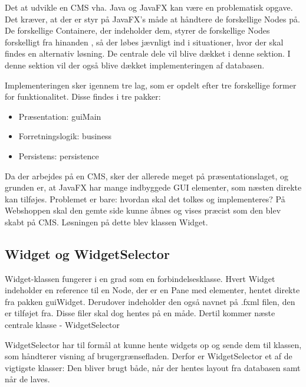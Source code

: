 
Det at udvikle en CMS vha. Java og JavaFX kan være en problematisk opgave. Det kræver, at der er styr på JavaFX's måde at håndtere de forskellige Nodes på. De forskellige Containere, der indeholder dem, styrer de forskellige Nodes forskelligt fra hinanden , så der løbes jævnligt ind i situationer, hvor der skal findes en alternativ løsning. De centrale dele vil blive dækket i denne sektion. I denne sektion vil der også blive dækket implementeringen af databasen.

Implementeringen sker igennem tre lag, som er opdelt efter tre forskellige former for funktionalitet. Disse findes i tre pakker:

\begin{itemize}
    \item Præsentation: guiMain
    \item Forretningslogik: business
    \item Persistens: persistence
\end{itemize}

Da der arbejdes på en CMS, sker der allerede meget på præsentationslaget, og grunden er, at JavaFX har mange indbyggede GUI elementer, som næsten direkte kan tilføjes. Problemet er bare: hvordan skal det tolkes og implementeres? På Webshoppen skal den gemte side kunne åbnes og vises præcist som den blev skabt på CMS. Løsningen på dette blev klassen Widget.

\subsection{Widget og WidgetSelector}
Widget-klassen fungerer i en grad som en forbindelsesklasse. Hvert Widget indeholder en reference til en Node, der er en Pane med elementer, hentet direkte fra pakken guiWidget. Derudover indeholder den også navnet på .fxml filen, den er tilføjet fra. Disse filer skal dog hentes på en måde. Dertil kommer næste centrale klasse - WidgetSelector

WidgetSelector har til formål at kunne hente widgets op og sende dem til klassen, som håndterer visning af brugergrænsefladen. Derfor er WidgetSelector et af de vigtigste klasser: Den bliver brugt både, når der hentes layout fra databasen samt når de laves.


